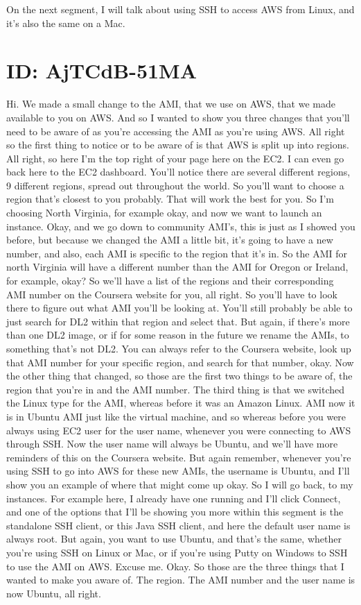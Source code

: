 \documentclass[10pt]{article}
\begin{document}
On the next segment, I will talk about using SSH to access AWS from Linux, and it's also the same on a Mac.

\section*{ID: AjTCdB-51MA}
Hi. We made a small change to the AMI, that we use on AWS, that we made available to you on AWS. And so I wanted to show you three changes that you'll need to be aware of as you're accessing the AMI as you're using AWS. All right so the first thing to notice or to be aware of is that AWS is split up into regions. All right, so here I'm the top right of your page here on the EC2. I can even go back here to the EC2 dashboard. You'll notice there are several different regions, 9 different regions, spread out throughout the world. So you'll want to choose a region that's closest to you probably. That will work the best for you. So I'm choosing North Virginia, for example okay, and now we want to launch an instance. Okay, and we go down to community AMI's, this is just as I showed you before, but because we changed the AMI a little bit, it's going to have a new number, and also, each AMI is specific to the region that it's in. So the AMI for north Virginia will have a different number than the AMI for Oregon or Ireland, for example, okay? So we'll have a list of the regions and their corresponding AMI number on the Coursera website for you, all right. So you'll have to look there to figure out what AMI you'll be looking at. You'll still probably be able to just search for DL2 within that region and select that. But again, if there's more than one DL2 image, or if for some reason in the future we rename the AMIs, to something that's not DL2. You can always refer to the Coursera website, look up that AMI number for your specific region, and search for that number, okay. Now the other thing that changed, so those are the first two things to be aware of, the region that you're in and the AMI number. The third thing is that we switched the Linux type for the AMI, whereas before it was an Amazon Linux. AMI now it is in Ubuntu AMI just like the virtual machine, and so whereas before you were always using EC2 user for the user name, whenever you were connecting to AWS through SSH. Now the user name will always be Ubuntu, and we'll have more reminders of this on the Coursera website. But again remember, whenever you're using SSH to go into AWS for these new AMIs, the username is Ubuntu, and I'll show you an example of where that might come up okay. So I will go back, to my instances. For example here, I already have one running and I'll click Connect, and one of the options that I'll be showing you more within this segment is the standalone SSH client, or this Java SSH client, and here the default user name is always root. But again, you want to use Ubuntu, and that's the same, whether you're using SSH on Linux or Mac, or if you're using Putty on Windows to SSH to use the AMI on AWS.  Excuse me. Okay. So those are the three things that I wanted to make you aware of. The region. The AMI number and the user name is now Ubuntu, all right.
\end{document}
